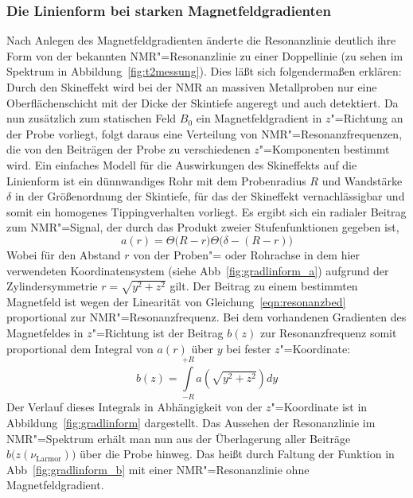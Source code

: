 \subsubsection{Die Linienform bei starken Magnetfeldgradienten}
Nach Anlegen des Magnetfeldgradienten änderte die Resonanzlinie deutlich ihre Form von der
bekannten NMR"=Resonanzlinie zu einer Doppellinie (zu sehen im Spektrum in
Abbildung~\ref{fig:t2messung}). Dies läßt sich folgendermaßen erklären: Durch den Skineffekt wird
bei der NMR an massiven Metallproben nur eine Oberflächenschicht mit der Dicke der Skintiefe
angeregt und auch detektiert. Da nun zusätzlich zum statischen Feld $B_0$ ein Magnetfeldgradient
in $z$"=Richtung an der Probe vorliegt, folgt daraus eine Verteilung von NMR"=Resonanzfrequenzen,
die von den Beiträgen der Probe zu verschiedenen $z$"=Komponenten bestimmt wird. Ein
einfaches Modell für die Auswirkungen des Skineffekts auf die Linienform ist ein dünnwandiges Rohr
mit dem Probenradius $R$ und Wandstärke $\delta$ in der Größenordnung der Skintiefe, für das der
Skineffekt vernachlässigbar und somit ein homogenes Tippingverhalten vorliegt. Es ergibt sich ein
radialer Beitrag zum NMR"=Signal, der durch das Produkt zweier Stufenfunktionen gegeben ist,
	\begin{equation}
		a(r) = \Theta\bigl(R-r\bigr)\Theta\bigl(\delta-(R-r)\bigr)
	\end{equation}
Wobei für den Abstand $r$ von der Proben"= oder Rohrachse in dem hier verwendeten Koordinatensystem
(siehe Abb~\ref{fig:gradlinform_a}) aufgrund der Zylindersymmetrie $r=\sqrt{y^2+z^2}$ gilt.
Der Beitrag zu einem bestimmten Magnetfeld ist wegen der Linearität von Gleichung~\eqref{eqn:resonanzbed}
proportional zur NMR"=Resonanzfrequenz. Bei dem vorhandenen Gradienten des Magnetfeldes in
$z$"=Richtung ist der Beitrag $b(z)$ zur Resonanzfrequenz somit proportional dem Integral von
$a(r)$ über $y$ bei fester $z$"=Koordinate:
	\begin{equation}
		\label{eqn:gradbeitrag}
		b(z) = \int\limits_{-R}^{+R}a(\sqrt{y^2+z^2})dy
	\end{equation}
Der Verlauf dieses Integrals in Abhängigkeit von der $z$"=Koordinate ist in
Abbildung~\ref{fig:gradlinform} dargestellt. Das Aussehen der Resonanzlinie im NMR"=Spektrum erhält man nun
aus der Überlagerung aller Beiträge $b\bigl(z(\nu_\mathrm{Larmor})\bigr)$ über die Probe hinweg.
Das heißt durch Faltung der Funktion in Abb~\ref{fig:gradlinform_b} mit einer NMR"=Resonanzlinie ohne
Magnetfeldgradient.

